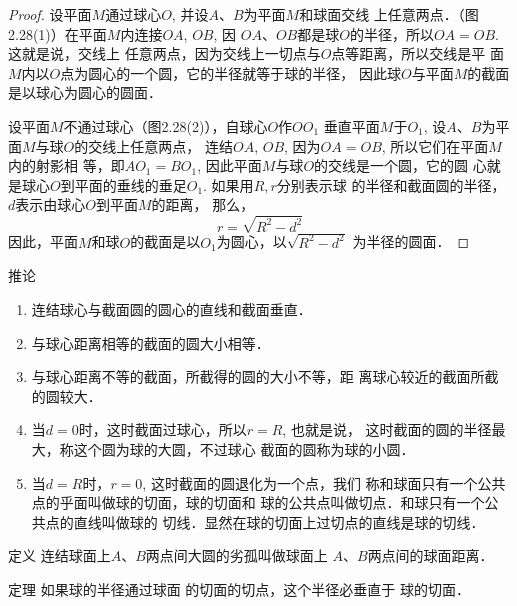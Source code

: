 \begin{proof}
    设平面$M$通过球心$O$, 并设$A$、$B$为平面$M$和球面交线
    上任意两点．（图2.28(1)）在平面$M$内连接$OA$, $OB$, 因
    $OA$、$OB$都是球$O$的半径，所以$OA=OB$. 这就是说，交线上
    任意两点，因为交线上一切点与$O$点等距离，所以交线是平
    面$M$内以$O$点为圆心的一个圆，它的半径就等于球的半径，
    因此球$O$与平面$M$的截面是以球心为圆心的圆面．

设平面$M$不通过球心（图2.28(2)），自球心$O$作$OO_1$
    垂直平面$M$于$O_1$, 设$A$、$B$为平面$M$与球$O$的交线上任意两点，
    连结$OA$, $OB$, 因为$OA=OB$, 所以它们在平面$M$内的射影相
    等，即$AO_1=BO_1$, 因此平面$M$与球$O$的交线是一个圆，它的圆
    心就是球心$O$到平面的垂线的垂足$O_1$. 如果用$R,r$分别表示球
    的半径和截面圆的半径，$d$表示由球心$O$到平面$M$的距离，
那么，
\[r=\sqrt{R^2-d^2}\]
因此，平面$M$和球$O$的截面是以$O_1$为圆心，以$\sqrt{R^2-d^2}$
为半径的圆面．
\end{proof}

\begin{blk}{推论}
\begin{enumerate}
\item 连结球心与截面圆的圆心的直线和截面垂直．
\item 与球心距离相等的截面的圆大小相等．
\item 与球心距离不等的截面，所截得的圆的大小不等，距
离球心较近的截面所截的圆较大．
\item 当$d=0$时，这时截面过球心，所以$r=R$, 也就是说，
这时截面的圆的半径最大，称这个圆为球的大圆，不过球心
截面的圆称为球的小圆．
\item 当$d=R$时，$r=0$, 这时截面的圆退化为一个点，我们
称和球面只有一个公共点的乎面叫做球的切面，球的切面和
球的公共点叫做切点．和球只有一个公共点的直线叫做球的
切线．显然在球的切面上过切点的直线是球的切线．
\end{enumerate}
    
\end{blk}

\begin{blk}{定义} 
    连结球面上$A$、$B$两点间大圆的劣孤叫做球面上
$A$、$B$两点间的球面距离．
\end{blk}

\begin{blk}
    {定理} 如果球的半径通过球面
    的切面的切点，这个半径必垂直于
    球的切面．
\end{blk}

